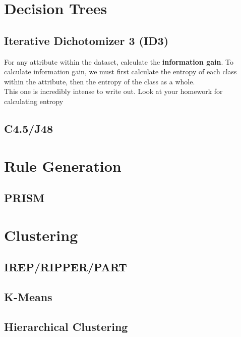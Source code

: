 \documentclass{article}
\begin{document}
\section{Decision Trees}
\subsection{Iterative Dichotomizer 3 (ID3)}
For any attribute within the dataset, calculate the \textbf{information gain}. To calculate information gain, we must first calculate the entropy of each class within the attribute, then the entropy of the class as a whole.\\
This one is incredibly intense to write out. Look at your homework for calculating entropy
\subsection{C4.5/J48}
\section{Rule Generation}
\subsection{PRISM}
\section{Clustering}
\subsection{IREP/RIPPER/PART}
\subsection{K-Means}
\subsection{Hierarchical Clustering}
\end{document}
